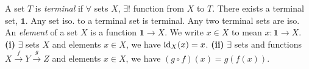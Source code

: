  A set $T$ is \textit{terminal} if $\forall$ sets $X$, $\exists!$ function from $X$ to $T$.
 There exists a terminal set, $\mathbf{1}$.
 Any set iso. to a terminal set is terminal.
 Any two terminal sets are iso.
 An \textit{element} of a set $X$ is a function $\mathbf{1} \to X$. We write $x \in X$ to mean $x \colon \mathbf{1} \to X$.
 \textbf{(i)} $\exists$ sets $X$ and elements $x \in X$, we have $\operatorname{id}_X(x) = x$. \textbf{(ii)} $\exists$ sets and functions $X \xrightarrow{f} Y \xrightarrow{g} Z$ and elements $x \in X$, we have $(g \circ f)(x) = g(f(x))$.
